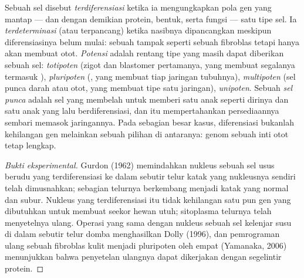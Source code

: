 \begin{definition}\label{def:b2:cell-differentiation:differentiation}
Sebuah sel disebut \emph{terdiferensiasi} ketika ia mengungkapkan pola
gen yang mantap --- dan dengan demikian protein, bentuk, serta
fungsi --- satu tipe sel. Ia \emph{terdeterminasi} (atau terpancang)
ketika nasibnya dipancangkan meskipun diferensiasinya belum mulai:
sebuah  tampak seperti sebuah fibroblas tetapi hanya akan
membuat otot. \emph{Potensi} adalah rentang tipe yang masih dapat
diberikan sebuah sel: \emph{totipoten} (zigot dan blastomer
pertamanya, yang membuat segalanya termasuk ),
\emph{pluripoten} (, yang membuat tiap jaringan
tubuhnya), \emph{multipoten} (sel punca darah atau otot, yang membuat
tipe satu jaringan), \emph{unipoten}. Sebuah \emph{sel punca} adalah
sel yang membelah untuk memberi satu anak seperti dirinya dan satu anak
yang lalu berdiferensiasi, dan itu mempertahankan persediaannya sembari
memasok jaringannya. Pada sebagian besar kasus, diferensiasi bukanlah
kehilangan gen melainkan sebuah pilihan di antaranya: genom sebuah inti
otot tetap lengkap.
\end{definition}
\begin{proof}[Bukti eksperimental]
Gurdon (1962) memindahkan nukleus sebuah sel usus berudu yang
terdiferensiasi ke dalam sebutir telur katak yang nukleusnya sendiri
telah dimusnahkan; sebagian telurnya berkembang menjadi katak yang
normal dan subur. Nukleus yang terdiferensiasi itu tidak kehilangan
satu pun gen yang dibutuhkan untuk membuat seekor hewan utuh;
sitoplasma telurnya telah menyetelnya ulang. Operasi yang sama dengan
nukleus sebuah sel kelenjar susu di dalam sebutir telur domba
menghasilkan Dolly (1996), dan pemrograman ulang sebuah fibroblas kulit
menjadi  pluripoten oleh empat  (Yamanaka,
2006) menunjukkan bahwa penyetelan ulangnya dapat dikerjakan dengan
segelintir protein.
\end{proof}

